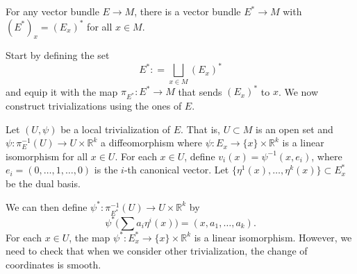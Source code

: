 \documentclass{ximera}
\begin{document}
\begin{example}
    For any vector bundle $E \to M$,  there is a vector bundle  $E^{\ast} \to M$  with $ ( E^{\ast} )_x  = (E_x)^{\ast}$ for all $x \in M$. 
\end{example}


\begin{solution}
Start by defining the set
\[     E^{\ast} : = \bigsqcup_{x \in M} (E_x)^{\ast}      \]
and equip it with the map $\pi_{E^{\ast}}:  E ^{\ast} \to M$ that sends $(E_x)^{\ast}$ to $x$. We now construct trivializations using the ones of $E$.  


Let $(U, \psi) $ be a local trivialization of $E$. That is, $U \subset M$ is an open set and $\psi : \pi_E ^{-1} (U ) \to U \times \mathbb{R}^k$ a diffeomorphism where $\psi : E_x \to \{ x \} \times \mathbb{R}^k$ is a linear isomorphism for all $x \in U$. For each $x \in U$, define $v_i  (x) = \psi ^{-1} (x,e_i)$, where $e_i = (0, \ldots , 1, \ldots , 0)$ is the $i$-th canonical vector. Let $\{ \eta ^1 (x), \ldots , \eta ^k(x) \} \subset E_x^{\ast}$ be the dual basis. 





We can then define $\psi ^{\ast} : \pi _{E^{\ast}}^{-1}(U)  \to U \times \mathbb{R}^k$  by
    \[    \psi ^{\ast} \Big(  \sum a_i \eta ^i (x) \Big) = ( x , a_1, \ldots , a_k ).                 \]
For each $x \in U$, the map $\psi ^{\ast} : E_x^{\ast} \to \{ x \} \times  \mathbb{R}^k$  is a linear isomorphism. However, we need to check that when we consider other trivialization, the change of coordinates is smooth. 


\end{solution}
\end{document}
